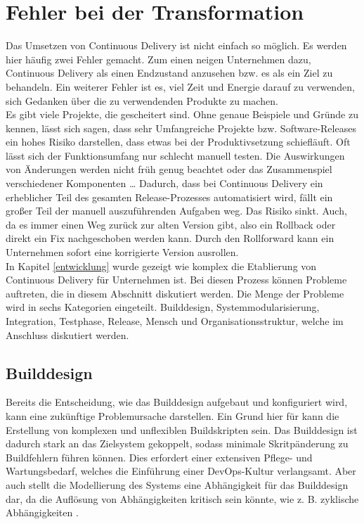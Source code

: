 \section{Fehler bei der Transformation} \label{Fehler bei der Transformation}

Das Umsetzen von Continuous Delivery ist nicht einfach so möglich. Es werden hier häufig zwei Fehler gemacht. Zum einen neigen Unternehmen dazu, Continuous Delivery als einen Endzustand anzusehen bzw. es als ein Ziel zu behandeln. Ein weiterer Fehler ist es, viel Zeit und Energie darauf zu verwenden, sich Gedanken über die zu verwendenden Produkte zu machen.\\Es gibt viele Projekte, die gescheitert sind. Ohne genaue Beispiele und Gründe zu kennen, lässt sich sagen, dass sehr Umfangreiche Projekte bzw. Software-Releases ein hohes Risiko darstellen, dass etwas bei der Produktivsetzung schiefläuft. Oft lässt sich der Funktionsumfang nur schlecht manuell testen. Die Auswirkungen von Änderungen werden nicht früh genug beachtet oder das Zusammenspiel verschiedener Komponenten …
Dadurch, dass bei Continuous Delivery ein erheblicher Teil des gesamten Release-Prozesses automatisiert wird, fällt ein großer Teil der manuell auszuführenden Aufgaben weg. Das Risiko sinkt. Auch, da es immer einen Weg zurück zur alten Version gibt, also ein Rollback oder direkt ein Fix nachgeschoben werden kann. Durch den Rollforward kann ein Unternehmen sofort eine korrigierte Version ausrollen.\\In Kapitel \ref{entwicklung} wurde gezeigt wie komplex die Etablierung von Continuous Delivery für Unternehmen ist. Bei diesen Prozess können Probleme auftreten, die in diesem Abschnitt diskutiert werden. Die Menge der Probleme wird in sechs Kategorien eingeteilt. Builddesign, Systemmodularisierung, Integration, Testphase, Release, Mensch und Organisationsstruktur, welche im Anschluss diskutiert werden.

\subsection{Builddesign} \label{builddesgin}
Bereits die Entscheidung, wie das Builddesign aufgebaut und konfiguriert wird, kann eine zukünftige Problemursache darstellen. Ein Grund hier für kann die Erstellung von komplexen und unflexiblen Buildskripten sein. Das Builddesign ist dadurch stark an das Zielsystem gekoppelt, sodass minimale Skritpänderung zu Buildfehlern führen können. Dies erfordert einer extensiven Pflege- und Wartungsbedarf, welches die Einführung einer DevOps-Kultur verlangsamt. Aber auch stellt die Modellierung des Systems eine Abhängigkeit für das Builddesign dar, da die Auflösung von Abhängigkeiten kritisch sein könnte, wie z. B. zyklische Abhängigkeiten \cite{Laukkanen.2017}.

